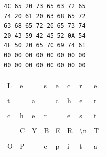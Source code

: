 \documentclass[11pt,a4paper]{article}
\begin{document}
\begin{table}[ht!]
  \centering
  \begin{minipage}{0.4\textwidth}
    \centering
\begin{lstlisting}[style=algorithmique]
4C 65 20 73 65 63 72 65
74 20 61 20 63 68 65 72
63 68 65 72 20 65 73 74
20 43 59 42 45 52 0A 54
4F 50 20 65 70 69 74 61
00 00 00 00 00 00 00 00
00 00 00 00 00 00 00 00
\end{lstlisting}
  \end{minipage}
  \hfillx
  \begin{minipage}{0.45\textwidth}
    \centering

%
%
%
%
%
%
%

\begin{tabular}{ | m{0.45cm} | m{0.45cm} | m{0.45cm} | m{0.45cm}   |   m{0.45cm} | m{0.45cm} | m{0.45cm} | m{0.45cm} | }
\hline
   &   &   &   &   &   &   &   \\
 L & e &   & s & e & c & r & e \\
\hline
   &   &   &   &   &   &   &   \\
 t &   & a &   & c & h & e & r \\
\hline
   &   &   &   &   &   &   &   \\
 c & h & e & r &   & e & s & t \\
\hline
   &   &   &   &   &   &                   & \cellcolor{black!15}   \\
   & C & Y & B & E & R & \textbackslash{}n & \cellcolor{black!15} T \\
\hline
\cellcolor{black!15}   & \cellcolor{black!15}   & \cellcolor{black!15} & \cellcolor{black!15}   & \cellcolor{black!15}   & \cellcolor{black!15}   & \cellcolor{black!15}   & \cellcolor{black!15}   \\
\cellcolor{black!15} O & \cellcolor{black!15} P & \cellcolor{black!15} & \cellcolor{black!15} e & \cellcolor{black!15} p & \cellcolor{black!15} i & \cellcolor{black!15} t & \cellcolor{black!15} a \\
\hline
\end{tabular}

  \end{minipage}
\end{table}
\end{document}
